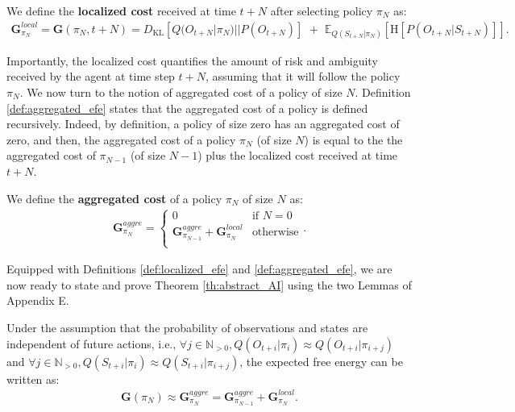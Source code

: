 \documentclass[twoside,11pt]{article}
\begin{document}
\begin{definition} \label{def:localized_efe}
We define the \textbf{localized cost} received at time $t+N$ after selecting policy $\pi_N$ as:
\begin{align}
\bm{G}^{local}_{\pi_N} = \bm{G}(\pi_N,t+N) = D_{\mathrm{KL}}[Q(O_{t+N}|\pi_N)||P(O_{t+N})]\,\, +\,\, \mathbb{E}_{Q(S_{t+N}|\pi_N)}[\text{H}[P(O_{t+N} | S_{t+N})]].
\end{align}
\end{definition}
Importantly, the localized cost quantifies the amount of risk and ambiguity received by the agent at time step $t+N$, assuming that it will follow the policy $\pi_N$. We now turn to the notion of aggregated cost of a policy of size $N$. Definition \ref{def:aggregated_efe} states that the aggregated cost of a policy is defined recursively. Indeed, by definition, a policy of size zero has an aggregated cost of zero, and then, the aggregated cost of a policy $\pi_N$ (of size $N$) is equal to the the aggregated cost of $\pi_{N - 1}$ (of size $N - 1$) plus the localized cost received at time $t+N$.

\begin{definition} \label{def:aggregated_efe}
We define the \textbf{aggregated cost} of a policy $\pi_N$ of size $N$ as:
\begin{align}
\bm{G}^{aggre}_{\pi_N} = \left\{ \begin{matrix}
0 & \text{if } N = 0\\
\bm{G}^{aggre}_{\pi_{N - 1}} + \bm{G}^{local}_{\pi_N} & \text{otherwise}\\
\end{matrix}\right. .
\end{align}
\end{definition}

Equipped with Definitions \ref{def:localized_efe} and \ref{def:aggregated_efe}, we are now ready to state and prove Theorem \ref{th:abstract_AI} using the two Lemmas of Appendix E.

\begin{theorem}\label{th:abstract_AI}
Under the assumption that the probability of observations and states are independent of future actions, i.e., $\forall j \in \mathbb{N}_{>0}, Q(O_{t+i}|\pi_{i}) \approx Q(O_{t+i}|\pi_{i+j})$ and $\forall j \in \mathbb{N}_{>0}, Q(S_{t+i}|\pi_{i}) \approx Q(S_{t+i}|\pi_{i+j})$, the expected free energy can be written as:
\begin{align}\label{abstract_AI}
\bm{G}(\pi_N) \approx \bm{G}_{\pi_{N}}^{aggre} = \bm{G}_{\pi_{N-1}}^{aggre} + \bm{G}_{\pi_{N}}^{local}.	
\end{align}
\end{theorem}
\end{document}
